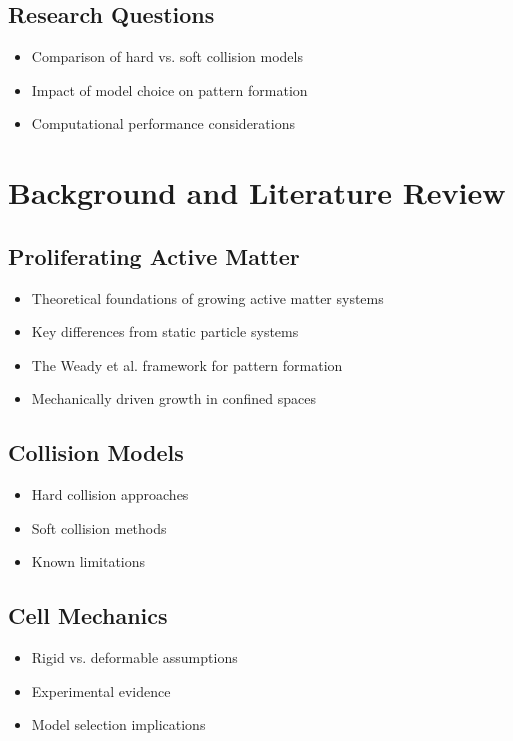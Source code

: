 \documentclass[conference]{IEEEtran}
\begin{document}
\newpage

\subsection{Research Questions}
\begin{itemize}
    \item Comparison of hard vs. soft collision models
    \item Impact of model choice on pattern formation
    \item Computational performance considerations
\end{itemize}

\newpage

\section{Background and Literature Review}


\subsection{Proliferating Active Matter}
\begin{itemize}
    \item Theoretical foundations of growing active matter systems
    \item Key differences from static particle systems
    \item The Weady et al. framework for pattern formation
    \item Mechanically driven growth in confined spaces
\end{itemize}

\newpage

\subsection{Collision Models}
\begin{itemize}
    \item Hard collision approaches
    \item Soft collision methods
    \item Known limitations
\end{itemize}

\newpage

\subsection{Cell Mechanics}
\begin{itemize}
    \item Rigid vs. deformable assumptions
    \item Experimental evidence
    \item Model selection implications
\end{itemize}
\end{document}
